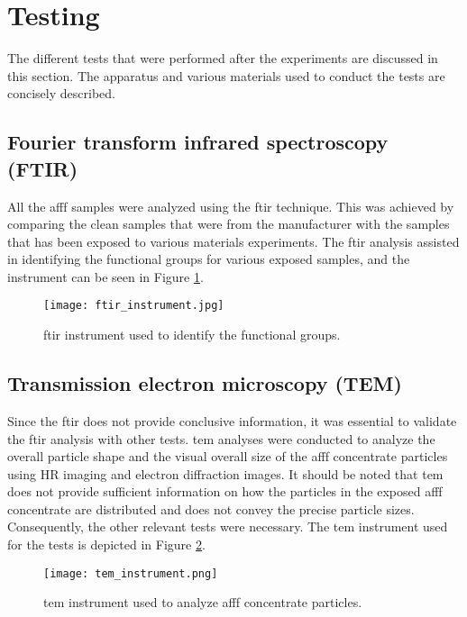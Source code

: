 \section{Testing} 
The different tests that were performed after the experiments are discussed in this section. The apparatus and various materials used to conduct the tests are concisely described.

\subsection{Fourier transform infrared spectroscopy (FTIR)}
All the \acrshort{afff} samples were analyzed using the \acrshort{ftir} technique. This was achieved by comparing the clean samples that were from the manufacturer with the samples that has been exposed to various materials experiments. The \acrshort{ftir} analysis assisted in identifying the functional groups for various exposed samples, and the instrument can be seen in Figure \ref{ch4:figure:ftir}.
 
\begin{figure}[H]
    \texttt{[image: ftir\_instrument.jpg]}
    \caption{\acrshort{ftir} instrument used to identify the functional groups.}
    \label{ch4:figure:ftir}
\end{figure}

\subsection{Transmission electron microscopy (TEM)}
Since the \acrshort{ftir} does not provide conclusive information, it was essential to validate the \acrshort{ftir} analysis with other tests. \acrshort{tem} analyses were conducted to analyze the overall particle shape and the visual overall size of the \acrshort{afff} concentrate particles using HR imaging and electron diffraction images. It should be noted that \acrshort{tem} does not provide sufficient information on how the particles in the exposed \acrshort{afff} concentrate are distributed and does not convey the precise particle sizes. Consequently, the other relevant tests were necessary. The \acrshort{tem} instrument used for the tests is depicted in Figure \ref{ch4:figure:tem}.
 
\begin{figure}[H]
    \texttt{[image: tem\_instrument.png]}
    \caption{\acrshort{tem} instrument used to analyze \acrshort{afff} concentrate particles.}
    \label{ch4:figure:tem}
\end{figure}

